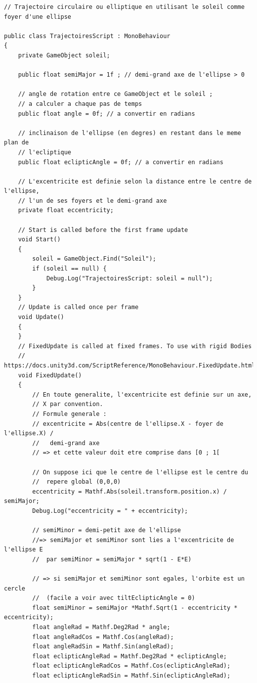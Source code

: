 \documentclass[a4paper,10pt]{article}
\newenvironment{solution}%
{\begin{tcolorbox}[breakable,colback=red!5!white,colframe=red!75!black,title=Solution]}%
{\end{tcolorbox}}
\begin{document}
\begin{solution}
\begin{lstlisting}
// Trajectoire circulaire ou elliptique en utilisant le soleil comme foyer d'une ellipse

public class TrajectoiresScript : MonoBehaviour
{
	private GameObject soleil;
	
	public float semiMajor = 1f ; // demi-grand axe de l'ellipse > 0
	
	// angle de rotation entre ce GameObject et le soleil ; 
	// a calculer a chaque pas de temps 
	public float angle = 0f; // a convertir en radians
	
	// inclinaison de l'ellipse (en degres) en restant dans le meme plan de
	// l'ecliptique
	public float eclipticAngle = 0f; // a convertir en radians
	
	// L'excentricite est definie selon la distance entre le centre de l'ellipse, 
	// l'un de ses foyers et le demi-grand axe
	private float eccentricity;
	
	// Start is called before the first frame update
	void Start()
	{
		soleil = GameObject.Find("Soleil");
		if (soleil == null) {
			Debug.Log("TrajectoiresScript: soleil = null");
		}
	}
	// Update is called once per frame
	void Update()
	{
	}
	// FixedUpdate is called at fixed frames. To use with rigid Bodies
	// https://docs.unity3d.com/ScriptReference/MonoBehaviour.FixedUpdate.html
	void FixedUpdate()
	{
		// En toute generalite, l'excentricite est definie sur un axe, 
		// X par convention.
		// Formule generale : 
		// excentricite = Abs(centre de l'ellipse.X - foyer de l'ellipse.X) /
		//   demi-grand axe
		// => et cette valeur doit etre comprise dans [0 ; 1[
		
		// On suppose ici que le centre de l'ellipse est le centre du 
		//  repere global (0,0,0)
		eccentricity = Mathf.Abs(soleil.transform.position.x) / semiMajor;
		Debug.Log("eccentricity = " + eccentricity);
		
		// semiMinor = demi-petit axe de l'ellipse
		//=> semiMajor et semiMinor sont lies a l'excentricite de l'ellipse E 
		//  par semiMinor = semiMajor * sqrt(1 - E*E)
		
		// => si semiMajor et semiMinor sont egales, l'orbite est un cercle 
		//  (facile a voir avec tiltEclipticAngle = 0)
		float semiMinor = semiMajor *Mathf.Sqrt(1 - eccentricity * eccentricity);
		float angleRad = Mathf.Deg2Rad * angle;
		float angleRadCos = Mathf.Cos(angleRad);
		float angleRadSin = Mathf.Sin(angleRad);
		float eclipticAngleRad = Mathf.Deg2Rad * eclipticAngle;
		float eclipticAngleRadCos = Mathf.Cos(eclipticAngleRad);
		float eclipticAngleRadSin = Mathf.Sin(eclipticAngleRad);
		

\end{lstlisting}
\end{solution}
\end{document}
